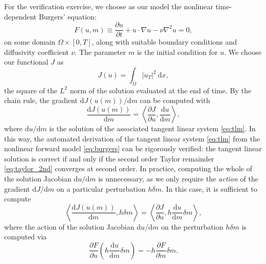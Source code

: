 \documentclass{siamltex}
\begin{document}
For the verification exercise, we choose as our model the nonlinear time-dependent Burgers'
equation:
\begin{equation} \label{eq:burgers}
  F(u, m) \equiv \frac{\partial u}{\partial t} + u \cdot \nabla u - \nu \nabla^2 u = 0,
\end{equation}
on some domain $\Omega \times [0, T]$, along with suitable boundary conditions and diffusivity coefficient $\nu$. The parameter $m$ is the initial condition
for $u$. We choose our functional $J$ as
\begin{equation}
  J(u) = \int_{\Omega} \left| u_T \right|^2 \ \textrm{d}x,
\end{equation}
the square of the $L^2$ norm of the solution evaluated at the end of time. By the chain rule, the gradient
${\textrm{d}J(u(m))}/{\textrm{d}m}$ can be computed with
\begin{equation}
  \frac{\textrm{d}J(u(m))}{\textrm{d}m} = \left \langle \frac{\partial J}{\partial u}, \frac{\textrm{d}u}{\textrm{d}m} \right \rangle,
\end{equation}
where ${\textrm{d}u}/{\textrm{d}m}$ is the solution of the associated tangent linear system \eqref{eq:tlm}.
In this way, the automated derivation of the tangent linear system \eqref{eq:tlm} from the nonlinear
forward model \eqref{eq:burgers} can be rigorously verified: the tangent linear solution is correct
if and only if the second order Taylor remainder \eqref{eq:taylor_2nd} converges at second order.
In practice, computing the whole of the solution Jacobian ${\textrm{d}u}/{\textrm{d}m}$ is unnecessary, as we only require
the \emph{action} of the gradient ${\textrm{d}J}/{\textrm{d}m}$ on a particular perturbation $h \delta m$. In this case,
it is sufficient to compute
\begin{equation}
  \left\langle \frac{\textrm{d}J(u(m))}{\textrm{d}m}, h \delta m \right \rangle = \left \langle \frac{\partial J}{\partial u}, h \frac{\textrm{d}u}{\textrm{d}m} \delta m\right \rangle,
\end{equation}
where the action of the solution Jacobian ${\textrm{d}u}/{\textrm{d}m}$ on the perturbation $h \delta m$ is computed via
\begin{equation}
  \frac{\partial F}{\partial u} \left(h \frac{\textrm{d}u}{\textrm{d}m} \delta m\right) = - h \frac{\partial F}{\partial m} \delta m.
\end{equation}
\end{document}
